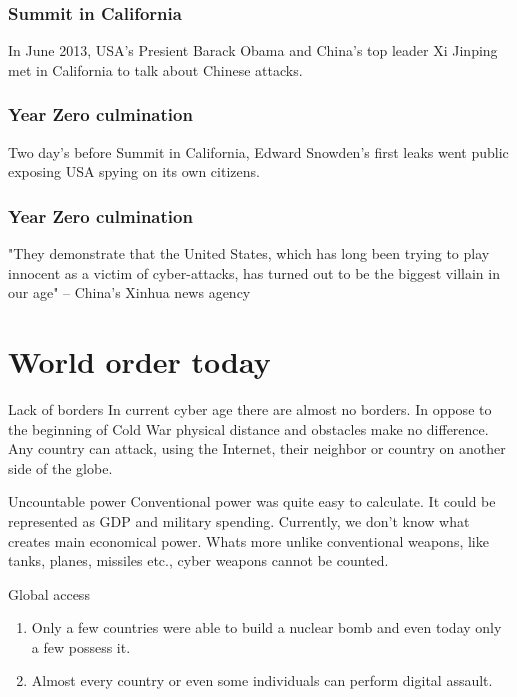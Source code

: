\documentclass[xcolor=table]{beamer}
\begin{document}
\begin{frame}
\frametitle{Summit in California}
\Large{In June 2013, USA's Presient Barack Obama and China's top leader Xi Jinping met in California to talk about Chinese attacks.}
\end{frame}

\begin{frame}
\frametitle{Year Zero culmination}
\Large{Two day's before Summit in California, Edward Snowden's first leaks went public exposing USA spying on its own citizens.}
\end{frame}

\begin{frame}
\frametitle{Year Zero culmination}
\Large{"They demonstrate that the United States, which has long been trying to play innocent as a victim of cyber-attacks, has turned out to be the biggest villain in our age" -- China's Xinhua news agency}
\end{frame}

\section{World order today}
\begin{frame}{Lack of borders}
\Large{In current cyber age there are almost no borders. In oppose to the beginning of Cold War physical distance and obstacles make no difference. Any country can attack, using the Internet, their neighbor or country on another side of the globe.}
\end{frame}

\begin{frame}{Uncountable power}
\Large{Conventional power was quite easy to calculate. It could be represented as GDP and military spending. Currently, we don't know what creates main economical power. Whats more unlike conventional weapons, like tanks, planes, missiles etc., cyber weapons cannot be counted.}
\end{frame}

\begin{frame}{Global access}
\begin{enumerate}
\item \Large{Only a few countries were able to build a nuclear bomb and even today only a few possess it.}
\item \Large{Almost every country or even some individuals can perform digital assault.}
\end{enumerate}
\end{frame}
\end{document}
